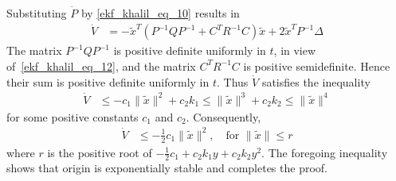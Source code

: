 \documentclass[12pt,a4paper,oneside]{book}
\begin{document}
\begin{onehalfspace}
Substituting $\dot{P}$ by \eqref{ekf_khalil_eq_10} results in
\begin{equation*}
	\begin{aligned}
		\dot{V}&=-\tilde{x}^T(P^{-1}QP^{-1}+C^TR^{-1}C)\tilde{x}+2\tilde{x}^TP^{-1}\Delta
	\end{aligned}
\end{equation*}
The matrix $P^{-1}QP^{-1}$ is positive definite uniformly in $t$, in view of~\eqref{ekf_khalil_eq_12}, and the matrix $C^TR^{-1}C$ is positive semidefinite. Hence their sum is positive definite uniformly in $t$. Thus $\dot{V}$ satisfies the inequality
\begin{equation*}
	\begin{aligned}
		\dot{V}&\le-c_1\|\tilde{x}\|^2+c_2k_1\le\|\tilde{x}\|^3+c_2k_2\le\|\tilde{x}\|^4
	\end{aligned}
\end{equation*}
for some positive constants $c_1$ and $c_2$. Consequently,
\begin{equation*}
	\begin{aligned}
		\dot{V}&\le-\frac{1}{2}c_1\|\tilde{x}\|^2,\quad\text{for }\|\tilde{x}\|\le r
	\end{aligned}
\end{equation*}
where $r$ is the positive root of $-\frac{1}{2}c_1+c_2k_1y+c_2k_2y^2$. The foregoing inequality shows that origin is exponentially stable and completes the proof. 


\end{onehalfspace}
\end{document}
